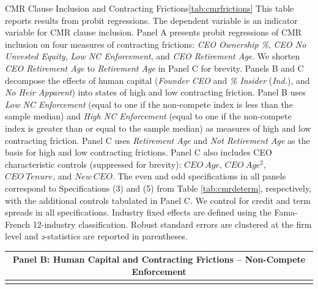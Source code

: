 \documentclass[a4paper,12pt]{article}
\begin{document}
\begin{singlespace}
\begin{papertable}{CMR Clause Inclusion and Contracting Frictions}{\ref{tab:cmrfrictions}}{}
    This table reports results from probit regressions.
    The dependent variable is an indicator variable for CMR clause inclusion.
    Panel A presents probit regressions of CMR inclusion on four measures of contracting frictions: \textit{CEO Ownership \%}, \textit{CEO No Unvested Equity}, \textit{Low NC Enforcement}, and \textit{CEO Retirement Age}.
    We shorten \textit{CEO Retirement Age} to \textit{Retirement Age} in Panel C for brevity.
    Panels B and C decompose the effects of human capital (\textit{Founder CEO} and \textit{\% Insider} (\textit{Ind.}), and \textit{No Heir Apparent}) into states of high and low contracting friction.
    Panel B uses \textit{Low NC Enforcement} (equal to one if the non-compete index is less than the sample median) and   \textit{High NC Enforcement} (equal to one if the non-compete index is greater than or equal to the sample median) as measures of high and low contracting friction.
    Panel C uses \textit{Retirement Age} and \textit{Not Retirement Age} as  the basis for high and low contracting frictions.
    Panel C also includes CEO characteristic controls (suppressed for brevity): $CEO\ Age$, $CEO\ Age^2$, $CEO\ Tenure$, and $New\ CEO$.
    The even and odd specifications in all panels correspond to Specifications (3) and (5) from Table \ref{tab:cmrdeterm}, respectively, with the additional controls tabulated in Panel C.
    We control for credit and term spreads in all specifications.
    Industry fixed effects are defined using the Fama-French 12-industry classification.
    Robust standard errors are clustered at the firm level and \textit{z}-statistics are reported in parentheses.
    \postamble

    \startdata
    

    \splittable \startdata

    \setlength\tabcolsep{4pt}
    \begin{tabular}{l*{6}{c}}
        \toprule
        \multicolumn{7}{c}{\small  {Panel B}: Human Capital and Contracting Frictions -- Non-Compete Enforcement} \\
        \midrule
        
        \addlinespace \midrule
        \multicolumn{7}{c}{\small  {Panel C}: Human Capital and Contracting Frictions -- CEO Retirement Age} \\
        \midrule
        
        \bottomrule
    \end{tabular}


\end{papertable}
\end{singlespace}
\end{document}

